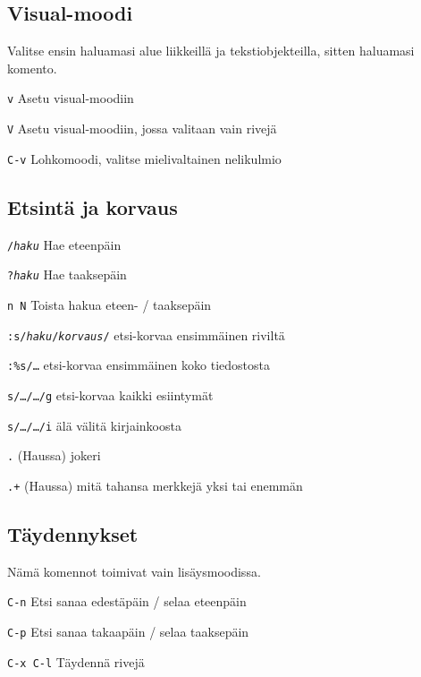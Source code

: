 \documentclass{article}
\newcommand{\com}[1]{{\large{\texttt{#1}}}}
\newcommand{\Com}[1]{\com{#1}  }
\begin{document}
\begin{multicols}{4}
\subsection*{Visual-moodi}
Valitse ensin haluamasi alue liikkeillä ja tekstiobjekteilla, sitten haluamasi komento.
\begin{description}
\item{\Com{v}} Asetu visual-moodiin
\item{\Com{V}} Asetu visual-moodiin, jossa valitaan vain rivejä
\item{\Com{C-v}} Lohkomoodi, valitse mielivaltainen nelikulmio
\end{description}

\subsection*{Etsintä ja korvaus}

\begin{description}
\item{\Com{/\emph{haku}}} Hae eteenpäin
\item{\Com{?\emph{haku}}} Hae taaksepäin
\item{\Com{n N}} Toista hakua eteen- / taaksepäin
\item{\Com{:s/\emph{haku}/\emph{korvaus}/}} etsi-korvaa ensimmäinen riviltä
\item{\Com{:\%s/\ldots}} etsi-korvaa ensimmäinen koko tiedostosta
\item{\Com{s/\dots/\dots/g}} etsi-korvaa kaikki esiintymät
\item{\Com{s/\dots/\dots/i}} älä välitä kirjainkoosta
\item{\Com{.}} (Haussa) jokeri
\item{\Com{.+}} (Haussa) mitä tahansa merkkejä yksi tai enemmän
\end{description}

\subsection*{Täydennykset}
Nämä komennot toimivat vain lisäysmoodissa.
\begin{description}
\item{\Com{C-n}} Etsi sanaa edestäpäin / selaa eteenpäin
\item{\Com{C-p}} Etsi sanaa takaapäin  / selaa taaksepäin
\item{\Com{C-x C-l}} Täydennä rivejä
\end{description}


\end{multicols}
\end{document}
